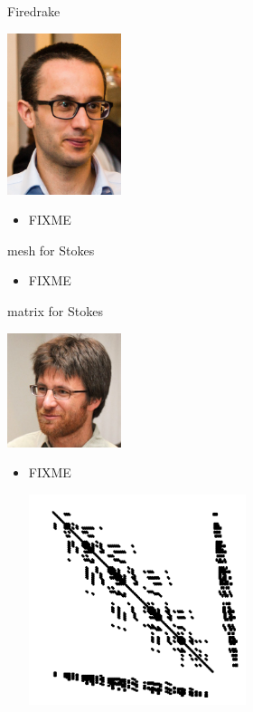 \documentclass[10pt,hyperref,dvipsnames]{beamer}
\begin{document}
\begin{frame}{Firedrake}

\hfill \includegraphics[width=0.25\textwidth]{figs/people/lmitchell.jpg}

\vspace{-20mm}
\begin{itemize}
\item FIXME
\end{itemize}
\end{frame}


\begin{frame}{mesh for Stokes}

\begin{itemize}
\item FIXME
\begin{center}

\end{center}
\end{itemize}
\end{frame}


\begin{frame}{matrix for Stokes}

\hfill \includegraphics[width=0.25\textwidth]{figs/people/jbrown.png}

\vspace{-20mm}
\begin{itemize}
\item FIXME
\begin{center}
\includegraphics[width=0.5\textwidth]{figs/Kstokes.pdf}
\end{center}
\end{itemize}
\end{frame}
\end{document}
